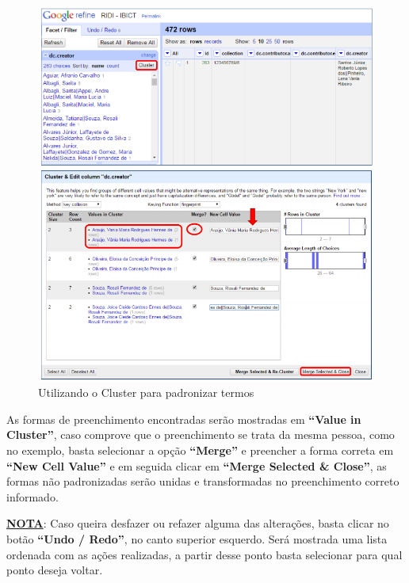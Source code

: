 \documentclass[12pt,hidelinks]{article}
\begin{document}
    \begin{figure}[!htp]
                \centering
                \includegraphics[scale=0.8]{figura/Figura194.png}
                \caption{Utilizando o Cluster para padronizar termos}
            \label{Rotulo}
        \end{figure}
        
\newpage

    As formas de preenchimento encontradas serão mostradas em \textbf{“Value in Cluster”}, caso comprove que o preenchimento se trata da mesma pessoa, como no exemplo, basta selecionar a opção \textbf{“Merge”} e preencher a forma correta em \textbf{“New Cell Value”} e em seguida clicar em \textbf{“Merge Selected \& Close”}, as formas não padronizadas serão unidas e transformadas no preenchimento correto informado.
    
    \singlespacing
    
    \underline{\textbf{NOTA}}: Caso queira desfazer ou refazer alguma das alterações, basta clicar no botão \textbf{“Undo / Redo”}, no canto superior esquerdo. Será mostrada uma lista ordenada com as ações realizadas, a partir desse ponto basta selecionar para qual ponto deseja voltar. 
    
\end{document}
